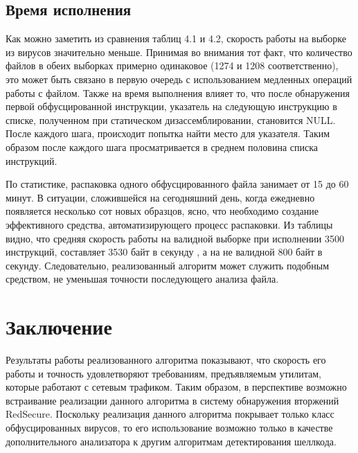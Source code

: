 \documentclass[oneside, final, 14pt]{extreport}
\begin{document}
 
\section{Время исполнения}

Как можно заметить из сравнения таблиц 4.1 и 4.2, скорость работы на выборке из вирусов значительно меньше. Принимая во внимания тот факт, что количество файлов в обеих выборках примерно одинаковое (1274 и 1208 соответственно), это может быть связано в первую очередь с использованием медленных операций работы с файлом. Также на время выполнения влияет то, что после обнаружения первой обфусцированной инструкции, указатель на следующую инструкцию в списке, полученном при статическом дизассемблировании, становится NULL. После каждого шага, происходит попытка найти место для указателя. Таким образом после каждого шага просматривается в среднем половина списка инструкций.

По статистике, распаковка одного обфусцированного файла занимает от 15 до 60 минут. В ситуации, сложившейся на сегодняшний день, когда ежедневно появляется несколько сот новых образцов, ясно, что необходимо создание эффективного средства, автоматизирующего процесс распаковки. Из таблицы видно, что средняя скорость работы на валидной выборке при исполнении 3500 инструкций, составляет 3530 байт в секунду , а на не валидной  800 байт в секунду. Следовательно, реализованный алгоритм может служить подобным средством, не уменьшая точности последующего анализа файла.   

\chapter{Заключение}
Результаты работы реализованного алгоритма показывают, что скорость его работы и точность удовлетворяют требованиям, предъявляемым утилитам, которые работают с сетевым трафиком. Таким образом, в перспективе возможно встраивание реализации данного алгоритма в систему обнаружения вторжений RedSecure. Поскольку реализация данного алгоритма покрывает только класс обфусцированных вирусов, то его использование возможно только в качестве дополнительного анализатора к другим алгоритмам детектирования шеллкода.
\end{document}
